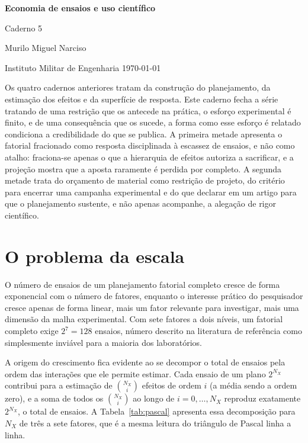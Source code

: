 \documentclass{doeapostila}
\begin{document}
\begin{center}
  {\large\bfseries Economia de ensaios e uso científico}\par\smallskip
  {\normalsize Caderno 5}\par\smallskip
  {\normalsize Murilo Miguel Narciso}\par\smallskip
  {\footnotesize Instituto Militar de Engenharia \textbullet{} \today}
\end{center}

\vspace{0.6\baselineskip}

\noindent
Os quatro cadernos anteriores tratam da construção do planejamento, da
estimação dos efeitos e da superfície de resposta. Este caderno fecha a série
tratando de uma restrição que os antecede na prática, o esforço experimental é
finito, e de uma consequência que os sucede, a forma como esse esforço é
relatado condiciona a credibilidade do que se publica. A primeira metade
apresenta o fatorial fracionado como resposta disciplinada à escassez de
ensaios, e não como atalho: fraciona-se apenas o que a hierarquia de efeitos
autoriza a sacrificar, e a projeção mostra que a aposta raramente é perdida
por completo. A segunda metade trata do orçamento de material como restrição
de projeto, do critério para encerrar uma campanha experimental e do que
declarar em um artigo para que o planejamento sustente, e não apenas
acompanhe, a alegação de rigor científico.

\vspace{0.6\baselineskip}

\tableofcontents

\section{O problema da escala}
\label{sec:escala}

O número de ensaios de um planejamento fatorial completo cresce de forma
exponencial com o número de fatores, enquanto o interesse prático do
pesquisador cresce apenas de forma linear, mais um fator relevante para
investigar, mais uma dimensão da malha experimental. Com sete fatores a dois
níveis, um fatorial completo exige $2^{7} = 128$ ensaios, número descrito na
literatura de referência como simplesmente inviável para a maioria dos
laboratórios.

A origem do crescimento fica evidente ao se decompor o total de ensaios pela
ordem das interações que ele permite estimar. Cada ensaio de um plano $2^{N_X}$
contribui para a estimação de $\binom{N_X}{i}$ efeitos de ordem $i$ (a média
sendo a ordem zero), e a soma de todos os $\binom{N_X}{i}$ ao longo de
$i = 0, \dots, N_X$ reproduz exatamente $2^{N_X}$, o total de ensaios. A
Tabela~\ref{tab:pascal} apresenta essa decomposição para $N_X$ de três a sete
fatores, que é a mesma leitura do triângulo de Pascal linha a linha.
\end{document}
